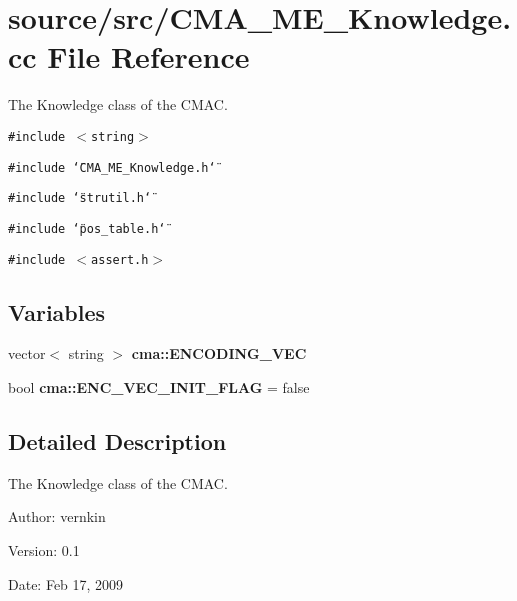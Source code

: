 \section{source/src/CMA\_\-ME\_\-Knowledge.cc File Reference}
\label{CMA__ME__Knowledge_8cc}
The Knowledge class of the CMAC.  


{\tt \#include $<$string$>$}\par
{\tt \#include \char`\"{}CMA\_\-ME\_\-Knowledge.h\char`\"{}}\par
{\tt \#include \char`\"{}strutil.h\char`\"{}}\par
{\tt \#include \char`\"{}pos\_\-table.h\char`\"{}}\par
{\tt \#include $<$assert.h$>$}\par
\subsection*{Variables}
\begin{CompactItemize}
\item 
vector$<$ string $>$ \textbf{cma::ENCODING\_\-VEC}\label{namespacecma_4a7190ab59f2fe11228c3043dc3d3628}

\item 
bool \textbf{cma::ENC\_\-VEC\_\-INIT\_\-FLAG} = false\label{namespacecma_c6b468e528120ab09e84acb8d18cb771}

\end{CompactItemize}


\subsection{Detailed Description}
The Knowledge class of the CMAC. 

\begin{Desc}
\item[Author:]vernkin \end{Desc}
\begin{Desc}
\item[Version:]0.1 \end{Desc}
\begin{Desc}
\item[Date:]Feb 17, 2009 \end{Desc}
